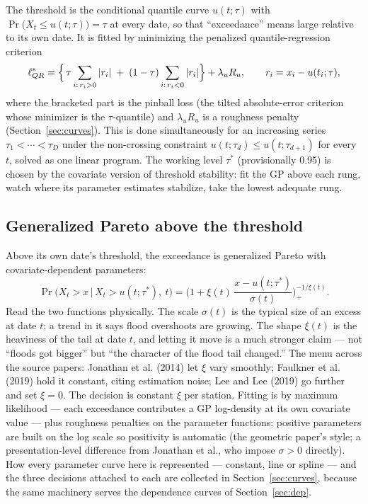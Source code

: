 \documentclass[11pt]{article}
\begin{document}
The threshold is the conditional quantile curve $u(t; \tau)$ with $\Pr\bigl(X_t \le u(t; \tau)\bigr) = \tau$ at every date, so that ``exceedance'' means large relative to its own date. It is fitted by minimizing the penalized quantile-regression criterion
\begin{equation}\label{eq:qr}
\ell^{*}_{QR} = \Bigl\{\, \tau \sum_{i:\, r_i > 0} |r_i| \;+\; (1 - \tau) \sum_{i:\, r_i < 0} |r_i| \Bigr\} + \lambda_u R_u, \qquad r_i = x_i - u(t_i; \tau),
\end{equation}
where the bracketed part is the pinball loss (the tilted absolute-error criterion whose minimizer is the $\tau$-quantile) and $\lambda_u R_u$ is a roughness penalty (Section~\ref{sec:curves}). This is done simultaneously for an increasing series $\tau_1 < \cdots < \tau_D$ under the non-crossing constraint $u(t; \tau_d) \le u(t; \tau_{d+1})$ for every $t$, solved as one linear program. The working level $\tau^{*}$ (provisionally 0.95) is chosen by the covariate version of threshold stability: fit the GP above each rung, watch where its parameter estimates stabilize, take the lowest adequate rung.

\subsection{Generalized Pareto above the threshold}\label{sec:gp}

Above its own date's threshold, the exceedance is generalized Pareto with covariate-dependent parameters:
\begin{equation}\label{eq:gp}
\Pr\bigl(X_t > x \,\big|\, X_t > u(t; \tau^{*}),\ t\bigr) = \biggl(1 + \xi(t)\, \frac{x - u(t; \tau^{*})}{\sigma(t)}\biggr)_{\!+}^{-1/\xi(t)}.
\end{equation}
Read the two functions physically. The scale $\sigma(t)$ is the typical size of an excess at date $t$; a trend in it says flood overshoots are growing. The shape $\xi(t)$ is the heaviness of the tail at date $t$, and letting it move is a much stronger claim --- not ``floods got bigger'' but ``the character of the flood tail changed.'' The menu across the source papers: Jonathan et al. (2014) let $\xi$ vary smoothly; Faulkner et al. (2019) hold it constant, citing estimation noise; Lee and Lee (2019) go further and set $\xi = 0$. The decision is constant $\xi$ per station. Fitting is by maximum likelihood --- each exceedance contributes a GP log-density at its own covariate value --- plus roughness penalties on the parameter functions; positive parameters are built on the log scale so positivity is automatic (the geometric paper's style; a presentation-level difference from Jonathan et al., who impose $\sigma > 0$ directly). How every parameter curve here is represented --- constant, line or spline --- and the three decisions attached to each are collected in Section~\ref{sec:curves}, because the same machinery serves the dependence curves of Section~\ref{sec:dep}.
\end{document}
